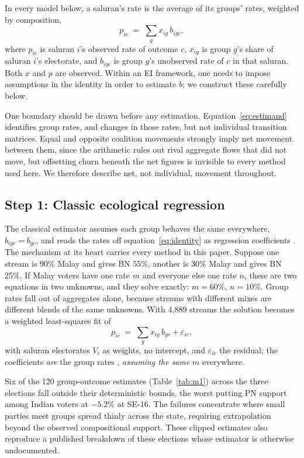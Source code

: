 \documentclass[11pt]{article}
\begin{document}
In every model below, a saluran's rate is the average of its groups' rates, weighted by composition,
\begin{equation}
	p_{ic} \;=\; \sum_g x_{ig}\, b_{igc},
	\label{eq:identity}
\end{equation}
where $p_{ic}$ is saluran $i$'s observed rate of outcome $c$, $x_{ig}$ is group $g$'s share of saluran $i$'s electorate, and $b_{igc}$ is group $g$'s unobserved rate of $c$ in that saluran. Both $x$ and $p$ are observed. Within an EI framework, one needs to impose assumptions in the identity in order to estimate $b$; we construct these carefully below.

One boundary should be drawn before any estimation. Equation~\eqref{eq:estimand} identifies group rates, and changes in those rates, but not individual transition matrices. Equal and opposite coalition movements strongly imply net movement between them, since the arithmetic rules out rival aggregate flows that did not move, but offsetting churn beneath the net figures is invisible to every method used here. We therefore describe net, not individual, movement throughout.

\subsection{Step 1: Classic ecological regression}
\label{sec:strategy-lpm}

The classical estimator assumes each group behaves the same everywhere, $b_{igc}=b_{gc}$, and reads the rates off equation~\eqref{eq:identity} as regression coefficients \cite{goodman1953}. The mechanism at its heart carries every method in this paper. Suppose one stream is 90\% Malay and gives BN 55\%, another is 30\% Malay and gives BN 25\%. If Malay voters have one rate $m$ and everyone else one rate $n$, these are two equations in two unknowns, and they solve exactly: $m=60\%$, $n=10\%$. Group rates fall out of aggregates alone, because streams with different mixes are different blends of the same unknowns. With 4,889 streams the solution becomes a weighted least-squares fit of
\begin{equation}
	p_{ic} \;=\; \sum_g x_{ig}\, b_{gc} + \varepsilon_{ic},
	\tag{M1}\label{eq:m1}
\end{equation}
with saluran electorates $V_i$ as weights, no intercept, and $\varepsilon_{ic}$ the residual; the coefficients \emph{are} the group rates \cite{goodman1953}, \emph{assuming the same} $m$ everywhere.

Six of the 120 group-outcome estimates (Table~\ref{tab:m1}) across the three elections fall outside their deterministic bounds, the worst putting PN support among Indian voters at $-5.2\%$ at SE-16. The failures concentrate where small parties meet groups spread thinly across the state, requiring extrapolation beyond the observed compositional support. These clipped estimates also reproduce a published breakdown of these elections whose estimator is otherwise undocumented.
\end{document}
